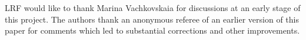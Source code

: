 
\vspace{.5cm}




LRF would like to thank Marina Vachkovskaia for discussions at an early stage of this project. 
The authors thank an anonymous referee of an earlier version of this
paper for comments which led to substantial corrections and other improvements.

